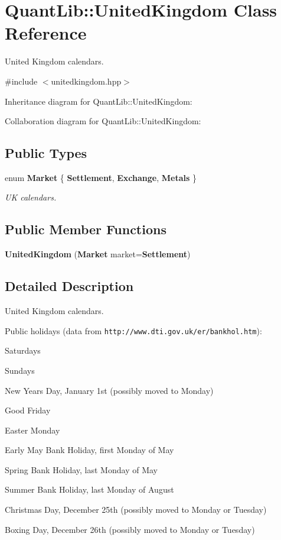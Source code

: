 \section{Quant\+Lib\+:\+:United\+Kingdom Class Reference}
\label{class_quant_lib_1_1_united_kingdom}


United Kingdom calendars.  




{\ttfamily \#include $<$unitedkingdom.\+hpp$>$}



Inheritance diagram for Quant\+Lib\+:\+:United\+Kingdom\+:


Collaboration diagram for Quant\+Lib\+:\+:United\+Kingdom\+:
\subsection*{Public Types}
\begin{DoxyCompactItemize}
\item 
enum {\bf Market} \{ {\bf Settlement}, 
{\bf Exchange}, 
{\bf Metals}
 \}\begin{DoxyCompactList}\small\item\em UK calendars. \end{DoxyCompactList}
\end{DoxyCompactItemize}
\subsection*{Public Member Functions}
\begin{DoxyCompactItemize}
\item 
{\bf United\+Kingdom} ({\bf Market} market={\bf Settlement})
\end{DoxyCompactItemize}


\subsection{Detailed Description}
United Kingdom calendars. 

Public holidays (data from {\tt http\+://www.\+dti.\+gov.\+uk/er/bankhol.\+htm})\+: 
\begin{DoxyItemize}
\item Saturdays 
\item Sundays 
\item New Year\textquotesingle{}s Day, January 1st (possibly moved to Monday) 
\item Good Friday 
\item Easter Monday 
\item Early May Bank Holiday, first Monday of May 
\item Spring Bank Holiday, last Monday of May 
\item Summer Bank Holiday, last Monday of August 
\item Christmas Day, December 25th (possibly moved to Monday or Tuesday) 
\item Boxing Day, December 26th (possibly moved to Monday or Tuesday) 
\end{DoxyItemize}

